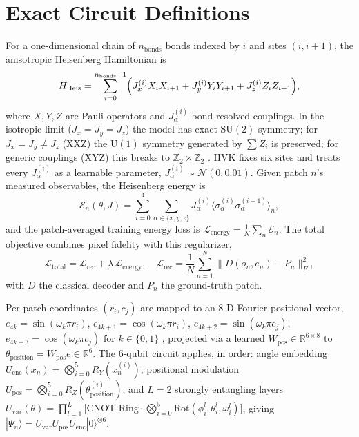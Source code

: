 \documentclass[journal]{IEEEtran}
\begin{document}
\section{Exact Circuit Definitions}
\label{app:circuits}
For a one-dimensional chain of $n_{\text{bonds}}$ bonds indexed by $i$ and sites $(i,i+1)$, the anisotropic Heisenberg Hamiltonian is
\begin{equation}
H_{\text{Heis}} = \sum_{i=0}^{n_{\text{bonds}}-1}\Bigl(J_x^{(i)}X_i X_{i+1} + J_y^{(i)}Y_i Y_{i+1} + J_z^{(i)}Z_i Z_{i+1}\Bigr),
\end{equation}
where $X,Y,Z$ are Pauli operators and $J_\alpha^{(i)}$ bond-resolved couplings. In the isotropic limit ($J_x=J_y=J_z$) the model has exact $\mathrm{SU}(2)$ symmetry; for $J_x=J_y\neq J_z$ (XXZ) the $\mathrm{U}(1)$ symmetry generated by $\sum Z_i$ is preserved; for generic couplings (XYZ) this breaks to $\mathbb{Z}_2\times\mathbb{Z}_2$ \cite{Craps2024}. HVK fixes six sites and treats every $J_\alpha^{(i)}$ as a learnable parameter, $J_\alpha^{(i)}\sim\mathcal{N}(0,0.01)$. Given patch $n$'s measured observables, the Heisenberg energy is
\begin{equation}
\mathcal{E}_n(\theta,J) = \sum_{i=0}^{4}\sum_{\alpha\in\{x,y,z\}} J_\alpha^{(i)}\langle\sigma_\alpha^{(i)}\sigma_\alpha^{(i+1)}\rangle_n,
\end{equation}
and the patch-averaged training energy loss is $\mathcal{L}_{\text{energy}}=\frac{1}{N}\sum_n \mathcal{E}_n$. The total objective combines pixel fidelity with this regularizer,
\begin{equation}
\mathcal{L}_{\text{total}} = \mathcal{L}_{\text{rec}} + \lambda\,\mathcal{L}_{\text{energy}}, \quad
\mathcal{L}_{\text{rec}} = \frac{1}{N}\sum_{n=1}^{N}\bigl\|D(o_n,e_n)-P_n\bigr\|_F^2,
\end{equation}
with $D$ the classical decoder and $P_n$ the ground-truth patch.

Per-patch coordinates $(r_i,c_j)$ are mapped to an 8-D Fourier positional vector, $e_{4k}=\sin(\omega_k\pi r_i)$, $e_{4k+1}=\cos(\omega_k\pi r_i)$, $e_{4k+2}=\sin(\omega_k\pi c_j)$, $e_{4k+3}=\cos(\omega_k\pi c_j)$ for $k\in\{0,1\}$ \cite{Xu2021}, projected via a learned $W_{\text{pos}}\in\mathbb{R}^{6\times8}$ to $\theta_{\text{position}}=W_{\text{pos}}e\in\mathbb{R}^6$. The 6-qubit circuit applies, in order: angle embedding $U_{\text{enc}}(x_n)=\bigotimes_{i=0}^{5}R_Y(x_n^{(i)})$; positional modulation $U_{\text{pos}}=\bigotimes_{i=0}^{5}R_Z(\theta_{\text{position}}^{(i)})$; and $L=2$ strongly entangling layers $U_{\text{var}}(\theta)=\prod_{l=1}^{L}\bigl[\text{CNOT-Ring}\cdot\bigotimes_{i=0}^{5}\text{Rot}(\phi_i^l,\theta_i^l,\omega_i^l)\bigr]$, giving $|\Psi_n\rangle = U_{\text{var}}U_{\text{pos}}U_{\text{enc}}|0\rangle^{\otimes6}$.
\end{document}
